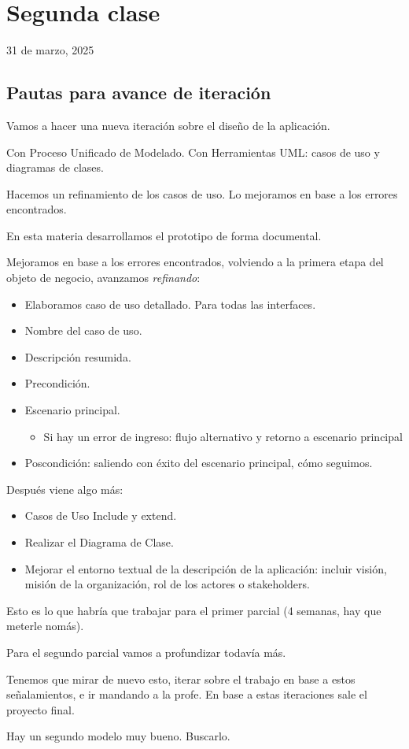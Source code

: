 \section{Segunda clase}

31 de marzo, 2025

\subsection{Pautas para avance de iteración}

Vamos a hacer una nueva iteración sobre el diseño de la aplicación.

Con Proceso Unificado de Modelado.
Con Herramientas UML: casos de uso y diagramas de clases.

Hacemos un refinamiento de los casos de uso.
Lo mejoramos en base a los errores encontrados.

En esta materia desarrollamos el prototipo de forma documental.

Mejoramos en base a los errores encontrados,
volviendo a la primera etapa del objeto de negocio,
avanzamos \textit{refinando}:
\begin{itemize}
    \item Elaboramos caso de uso detallado. Para todas las interfaces.
    \item Nombre del caso de uso.
    \item Descripción resumida.
    \item Precondición.
    \item Escenario principal.
    \begin{itemize}
        \item Si hay un error de ingreso: flujo alternativo y retorno a escenario principal
    \end{itemize}
    \item Poscondición: saliendo con éxito del escenario principal, cómo seguimos.
\end{itemize}

Después viene algo más:
\begin{itemize}
    \item Casos de Uso Include y extend.
    \item Realizar el Diagrama de Clase.
    \item Mejorar el entorno textual de la descripción de la aplicación: incluir visión, misión de la organización, rol de los actores o stakeholders.
\end{itemize}

Esto es lo que habría que trabajar para el primer parcial (4 semanas, hay que meterle nomás).

Para el segundo parcial vamos a profundizar todavía más.

Tenemos que mirar de nuevo esto,
iterar sobre el trabajo en base a estos señalamientos,
e ir mandando a la profe.
En base a estas iteraciones sale el proyecto final.

Hay un segundo modelo muy bueno. Buscarlo.